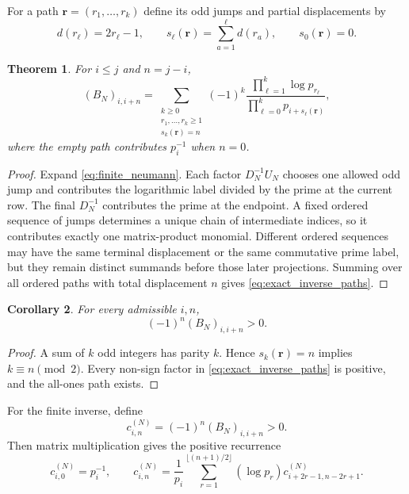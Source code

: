 \documentclass[11pt]{amsart}
\numberwithin{equation}{section}
\theoremstyle{plain}
\newtheorem{theorem}{Theorem}[section]
\newtheorem{corollary}[theorem]{Corollary}
\theoremstyle{definition}
\theoremstyle{remark}
\begin{document}
For a path $\mathbf r=(r_1,\ldots,r_k)$ define its odd jumps and partial displacements by
\begin{equation}
d(r_\ell)=2r_\ell-1,
\qquad
s_\ell(\mathbf r)=\sum_{a=1}^{\ell}d(r_a),
\qquad s_0(\mathbf r)=0.
\label{eq:path_displacements}
\end{equation}

\begin{theorem}
\label{thm:exact_inverse}
For $i\le j$ and $n=j-i$,
\begin{equation}
(B_N)_{i,i+n}
=
\sum_{\substack{k\ge0\\r_1,\ldots,r_k\ge1\\s_k(\mathbf r)=n}}
(-1)^k
\frac{\prod_{\ell=1}^k\log p_{r_\ell}}
{\prod_{\ell=0}^k p_{i+s_\ell(\mathbf r)}},
\label{eq:exact_inverse_paths}
\end{equation}
where the empty path contributes $p_i^{-1}$ when $n=0$.
\end{theorem}

\begin{proof}
Expand \eqref{eq:finite_neumann}.  Each factor $D_N^{-1}U_N$ chooses one allowed odd jump and contributes the logarithmic label divided by the prime at the current row.  The final $D_N^{-1}$ contributes the prime at the endpoint.  A fixed ordered sequence of jumps determines a unique chain of intermediate indices, so it contributes exactly one matrix-product monomial.  Different ordered sequences may have the same terminal displacement or the same commutative prime label, but they remain distinct summands before those later projections.  Summing over all ordered paths with total displacement $n$ gives \eqref{eq:exact_inverse_paths}.
\end{proof}

\begin{corollary}
\label{cor:sign_rigidity}
For every admissible $i,n$,
\begin{equation}
(-1)^n(B_N)_{i,i+n}>0.
\label{eq:sign_rigidity}
\end{equation}
\end{corollary}

\begin{proof}
A sum of $k$ odd integers has parity $k$.  Hence $s_k(\mathbf r)=n$ implies $k\equiv n\pmod2$.  Every non-sign factor in \eqref{eq:exact_inverse_paths} is positive, and the all-ones path exists.
\end{proof}

For the finite inverse, define
\begin{equation}
c_{i,n}^{(N)}=(-1)^n(B_N)_{i,i+n}>0.
\label{eq:c_definition}
\end{equation}
Then matrix multiplication gives the positive recurrence
\begin{equation}
c_{i,0}^{(N)}=p_i^{-1},
\qquad
c_{i,n}^{(N)}=\frac1{p_i}
\sum_{r=1}^{\lfloor(n+1)/2\rfloor}
(\log p_r)c_{i+2r-1,n-2r+1}^{(N)}.
\label{eq:positive_recurrence}
\end{equation}
\end{document}
